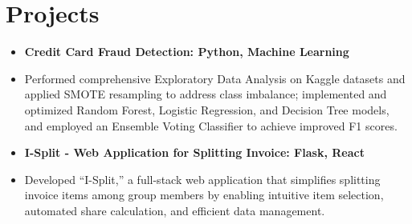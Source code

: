 \documentclass[a4paper,10pt]{article}
\newcommand{\textbulletlight}{\raisebox{0.15ex}{\scalebox{0.6}{$\bullet$}}}
\begin{document}
\vspace{3pt}
\section{Projects}

\begin{itemize}[leftmargin=0pt, label={}, itemsep=0pt, parsep=0pt, font=\normalfont]
\item {\small \textbf{Credit Card Fraud Detection: Python, Machine Learning}}
\end{itemize}\vspace{-6pt}
\begin{itemize}[leftmargin=12pt, labelsep=1pt, label={\textbulletlight}, itemsep=0pt, topsep=2pt]
        \item \small Performed comprehensive Exploratory Data Analysis on Kaggle datasets and applied SMOTE resampling to address class imbalance; implemented and optimized Random Forest, Logistic Regression, and Decision Tree models, and employed an Ensemble Voting Classifier to achieve improved F1 scores.
\end{itemize}

\begin{itemize}[leftmargin=0pt, label={}, itemsep=0pt, parsep=0pt, font=\normalfont]
\item {\small \textbf{I-Split - Web Application for Splitting Invoice: Flask, React}}
\end{itemize}\vspace{-6pt}
\begin{itemize}[leftmargin=12pt, labelsep=1pt, label={\textbulletlight}, itemsep=0pt, topsep=2pt]
        \item \small Developed ``I-Split,'' a full-stack web application that simplifies splitting invoice items among group members by enabling intuitive item selection, automated share calculation, and efficient data management.
\end{itemize}
\end{document}
